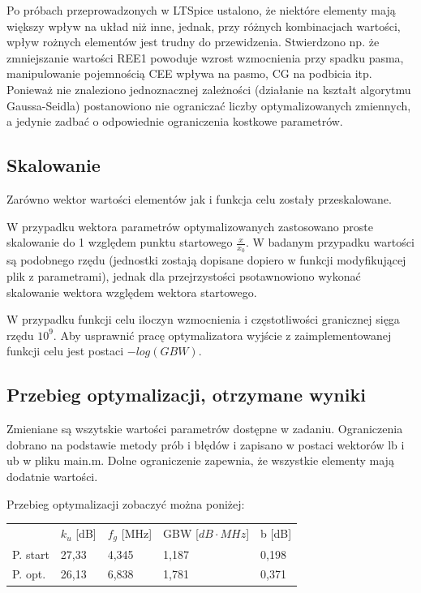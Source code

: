 \documentclass{article}
\begin{document}
Po próbach przeprowadzonych w LTSpice ustalono, że niektóre elementy mają większy wpływ na układ niż inne, jednak, przy różnych kombinacjach wartości, wpływ rożnych elementów jest trudny do przewidzenia.
Stwierdzono np. że zmniejszanie wartości REE1 powoduje wzrost wzmocnienia przy spadku pasma, manipulowanie pojemnością CEE wpływa na pasmo, CG na podbicia itp.
Ponieważ nie znaleziono jednoznacznej zależności (działanie na kształt algorytmu Gaussa-Seidla) postanowiono nie ograniczać liczby optymalizowanych zmiennych, a jedynie zadbać o odpowiednie
ograniczenia kostkowe parametrów.
\subsection*{Skalowanie}
Zarówno wektor wartości elementów jak i funkcja celu zostały przeskalowane.

W przypadku wektora parametrów optymalizowanych zastosowano proste skalowanie do 1 względem punktu startowego $\frac{x}{x_0}$.
W badanym przypadku wartości są podobnego rzędu (jednostki zostają dopisane dopiero w funkcji modyfikującej plik z parametrami), jednak dla przejrzystości psotawnowiono wykonać
skalowanie wektora względem wektora startowego.

W przypadku funkcji celu iloczyn wzmocnienia i częstotliwości granicznej sięga rzędu $10^9$.
Aby usprawnić pracę optymalizatora wyjście z zaimplementowanej funkcji celu jest postaci $-log(GBW)$.
\pagebreak
\subsection{Przebieg optymalizacji, otrzymane wyniki}
Zmieniane są wszytskie wartości parametrów dostępne w zadaniu. Ograniczenia dobrano na podstawie metody prób i błędów i zapisano w postaci wektorów lb i ub w pliku main.m.
Dolne ograniczenie zapewnia, że wszystkie elementy mają dodatnie wartości.

Przebieg optymalizacji zobaczyć można poniżej:

\begin{table}[h]
	\centering
	\begin{tabular}{lllll}
		         & $k_u$ {[}dB{]} & $f_g$ {[}MHz{]} & GBW {[}$dB \cdot MHz${]} & b {[}dB{]} \\
		P. start & 27,33          & 4,345           & 1,187                    & 0,198      \\
		P. opt.  & 26,13          & 6,838           & 1,781                    & 0,371
	\end{tabular}
\end{table}
\end{document}
